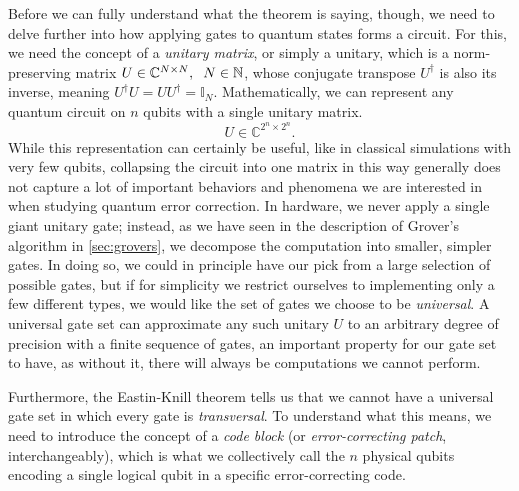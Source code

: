Before we can fully understand what the theorem is saying, though, we need to delve further into how applying gates to quantum states forms a circuit. For this, we need the concept of a \emph{unitary matrix}, or simply a unitary, which is a norm-preserving matrix $U \in \mathbb{C}^{N \times N}, \hspace{0.2cm} N \in \mathbb{N}$, whose conjugate transpose $U^\dagger$ is also its inverse, meaning $U^\dagger U = UU^\dagger = \mathbb{I}_N$. Mathematically, we can represent any quantum circuit on $n$ qubits with a single unitary matrix.
\[U \in \mathbb{C}^{2^n \times 2^n}.\]
While this representation can certainly be useful, like in classical simulations with very few qubits, collapsing the circuit into one matrix in this way generally does not capture a lot of important behaviors and phenomena we are interested in when studying quantum error correction. In hardware, we never apply a single giant unitary gate; instead, as we have seen in the description of Grover's algorithm in \cref{sec:grovers}, we decompose the computation into smaller, simpler gates. In doing so, we could in principle have our pick from a large selection of possible gates, but if for simplicity we restrict ourselves to implementing only a few different types, we would like the set of gates we choose to be \emph{universal}. A universal gate set can approximate any such unitary $U$ to an arbitrary degree of precision with a finite sequence of gates, an important property for our gate set to have, as without it, there will always be computations we cannot perform.

Furthermore, the Eastin-Knill theorem tells us that we cannot have a universal gate set in which every gate is \emph{transversal}. To understand what this means, we need to introduce the concept of a \emph{code block} (or \emph{error-correcting patch}, interchangeably), which is what we collectively call the $n$ physical qubits encoding a single logical qubit in a specific error-correcting code. 

\begin{center}
\end{center}

